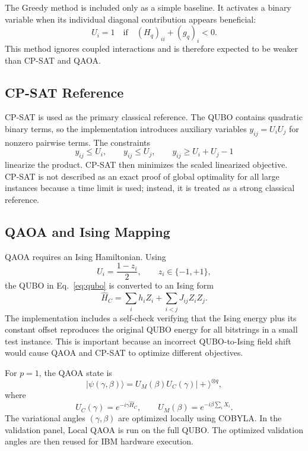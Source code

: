 \documentclass[runningheads]{llncs}
\begin{document}
The Greedy method is included only as a simple baseline. It activates a binary variable when its individual diagonal contribution appears beneficial:
\begin{equation}
U_i=1 \quad \mathrm{if} \quad (H_q)_{ii}+(g_q)_i<0.
\end{equation}
This method ignores coupled interactions and is therefore expected to be weaker than CP-SAT and QAOA.

\subsection{CP-SAT Reference}

CP-SAT is used as the primary classical reference. The QUBO contains quadratic binary terms, so the implementation introduces auxiliary variables $y_{ij}=U_iU_j$ for nonzero pairwise terms. The constraints
\begin{equation}
y_{ij}\leq U_i,\qquad y_{ij}\leq U_j,\qquad y_{ij}\geq U_i+U_j-1
\end{equation}
linearize the product. CP-SAT then minimizes the scaled linearized objective. CP-SAT is not described as an exact proof of global optimality for all large instances because a time limit is used; instead, it is treated as a strong classical reference.

\subsection{QAOA and Ising Mapping}

QAOA requires an Ising Hamiltonian. Using
\begin{equation}
U_i=\frac{1-z_i}{2},\qquad z_i\in\{-1,+1\},
\end{equation}
the QUBO in Eq.~\eqref{eq:qubo} is converted to an Ising form
\begin{equation}
\hat{H}_C=\sum_i h_iZ_i+\sum_{i<j}J_{ij}Z_iZ_j.
\end{equation}
The implementation includes a self-check verifying that the Ising energy plus its constant offset reproduces the original QUBO energy for all bitstrings in a small test instance. This is important because an incorrect QUBO-to-Ising field shift would cause QAOA and CP-SAT to optimize different objectives.

For $p=1$, the QAOA state is
\begin{equation}
|\psi(\gamma,\beta)\rangle =
U_M(\beta)U_C(\gamma)|+\rangle^{\otimes q},
\end{equation}
where
\begin{equation}
U_C(\gamma)=e^{-i\gamma \hat{H}_C}, \qquad
U_M(\beta)=e^{-i\beta\sum_i X_i}.
\end{equation}
The variational angles $(\gamma,\beta)$ are optimized locally using COBYLA. In the validation panel, Local QAOA is run on the full QUBO. The optimized validation angles are then reused for IBM hardware execution.
\end{document}
